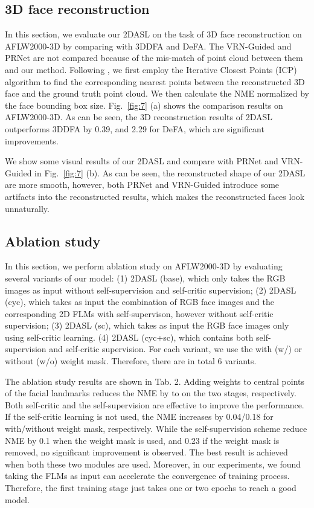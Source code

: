 \documentclass[10pt,twocolumn,letterpaper]{article}
\begin{document}
{\vspace{-0.1cm}
\subsection{3D face reconstruction}
In this section, we evaluate our 2DASL on the task of 3D face reconstruction on AFLW2000-3D by comparing with 3DDFA and DeFA. The VRN-Guided and PRNet are not compared because of the mis-match  of point cloud between them and our method. Following   \cite{feng2018joint}, we first employ the Iterative Closest Points (ICP) algorithm to find the corresponding nearest points between the reconstructed 3D face and the ground truth point cloud. We then calculate the NME normalized by the face bounding box size. Fig.~\ref{fig:7} (a) shows the comparison results on AFLW2000-3D. As can be seen, the 3D reconstruction results of 2DASL outperforms 3DDFA by 0.39, and 2.29 for DeFA, which are significant improvements.

We show some visual results of our 2DASL and compare with PRNet and VRN-Guided in Fig.~\ref{fig:7} (b). As can be seen, the reconstructed shape of our 2DASL are more smooth, however, both PRNet and VRN-Guided introduce some artifacts into the reconstructed results, which makes the reconstructed faces look unnaturally.


\vspace{0.2cm}
\subsection{Ablation study}
In this section, we perform ablation study on AFLW2000-3D by evaluating several variants of our model: (1) 2DASL (base), which only takes the RGB images as input without self-supervision and  self-critic supervision; (2) 2DASL (cyc), which takes as input the combination of RGB face images and the corresponding 2D FLMs with self-supervison, however without self-critic supervision; (3) 2DASL (sc), which takes as input the RGB face images only using self-critic  learning. (4) 2DASL (cyc+sc), which contains both self-supervision and self-critic  supervision. For each variant, we use the  with (w/) or without (w/o) weight mask. Therefore, there are in total 6 variants.

The ablation study results are shown in Tab. 2. Adding weights to central points of the facial landmarks reduces the NME   by  to  on the two stages, respectively. Both self-critic and the self-supervision are effective to improve the performance. If the self-critic learning is not used, the NME increases by 0.04/0.18 for with/without weight mask, respectively. While the self-supervision scheme reduce NME by 0.1 when the weight mask is used, and 0.23 if the weight mask is removed, no significant improvement is observed. The best result is achieved when both these two modules are used. Moreover, in our experiments, we found taking the FLMs as input can accelerate the convergence of training process. Therefore, the first training stage just takes one or two epochs to reach a good model.

}
\end{document}
